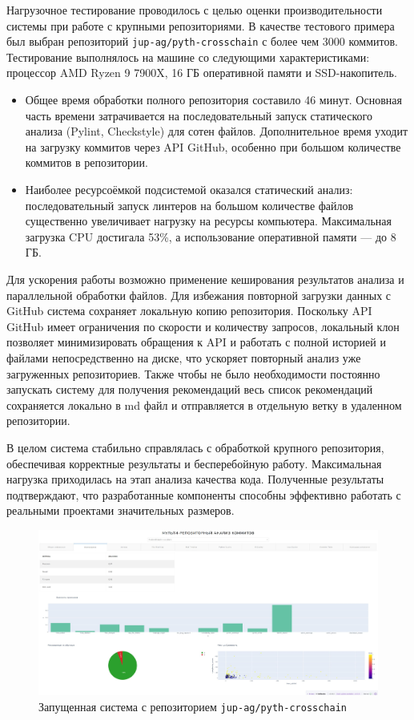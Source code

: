 Нагрузочное тестирование проводилось с целью оценки производительности системы при работе с крупными репозиториями. В качестве тестового примера был выбран репозиторий \texttt{jup-ag/pyth-crosschain} с более чем 3000 коммитов. Тестирование выполнялось на машине со следующими характеристиками: процессор AMD Ryzen 9 7900X, 16 ГБ оперативной памяти и SSD-накопитель.

\begin{itemize}
	\item Общее время обработки полного репозитория составило 46 минут. Основная часть времени затрачивается на последовательный запуск статического анализа (Pylint, Checkstyle) для сотен файлов. Дополнительное время уходит на загрузку коммитов через API GitHub, особенно при большом количестве коммитов в репозитории.
	
	\item Наиболее ресурсоёмкой подсистемой оказался статический анализ: последовательный запуск линтеров на большом количестве файлов существенно увеличивает нагрузку на ресурсы компьютера. Максимальная загрузка CPU достигала 53\%, а использование оперативной памяти — до 8 ГБ.
\end{itemize}
Для ускорения работы возможно применение кеширования результатов анализа и параллельной обработки файлов. Для избежания повторной загрузки данных с GitHub система сохраняет локальную копию репозитория. Поскольку API GitHub имеет ограничения по скорости и количеству запросов, локальный клон позволяет минимизировать обращения к API и работать с полной историей и файлами непосредственно на диске, что ускоряет повторный анализ уже загруженных репозиториев. Также чтобы не было необходимости постоянно запускать систему для получения рекомендаций весь список рекомендаций сохраняется локально в md файл и отправляется в отдельную ветку в удаленном репозитории.


В целом система стабильно справлялась с обработкой крупного репозитория, обеспечивая корректные результаты и бесперебойную работу. Максимальная нагрузка приходилась на этап анализа качества кода. Полученные результаты подтверждают, что разработанные компоненты способны эффективно работать с реальными проектами значительных размеров.

\begin{figure}[ht]
	\centering
	\includegraphics[width=\textwidth]{my_folder/images/nagruzka.png}
	\caption{Запущенная система с репозиторием \texttt{jup-ag/pyth-crosschain}}
	\label{tab:nagruzka}
\end{figure}

